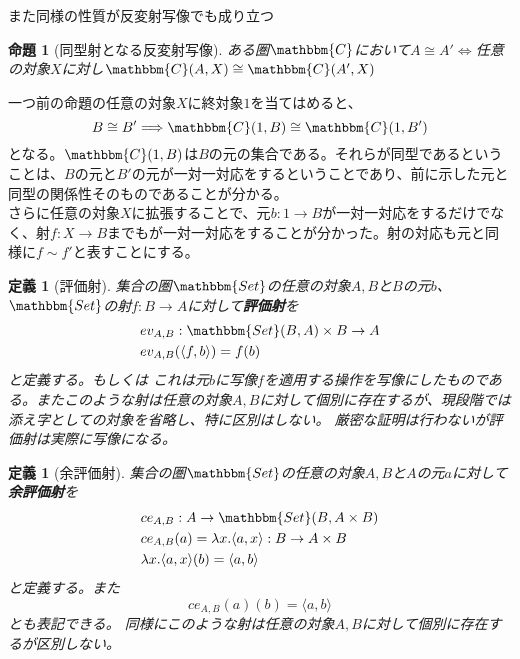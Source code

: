 \documentclass[uplatex,dvipdfmx]{jsarticle}
\newcommand{\cat}[1]{\mathbbm{#1}}
\newcommand{\arrow}{\rightarrow}
\newcommand{\tuple}[1]{\langle #1\rangle}
\newcommand{\mor}[3]{#1:#2\arrow #3}
\newcommand{\arset}[3]{\cat{#1}(#2,#3)}
\newtheorem{prop}[proof]{命題}
\newtheorem{define}[proof]{定義}
\numberwithin{proof}{subsection}
\begin{document}
  また同様の性質が反変射写像でも成り立つ
  \begin{prop}[同型射となる反変射写像]
    ある圏$\cat{C}$において$A\cong A'\iff$任意の対象$X$に対し$\arset{C}{A}{X}\cong\arset{C}{A'}{X}$
  \end{prop}

  一つ前の命題の任意の対象$X$に終対象$1$を当てはめると、\[B\cong B'\Longrightarrow \arset{C}{1}{B}\cong\arset{C}{1}{B'}\]となる。$\arset{C}{1}{B}$は$B$の元の集合である。それらが同型であるということは、$B$の元と$B'$の元が一対一対応をするということであり、前に示した元と同型の関係性そのものであることが分かる。\\
  さらに任意の対象$X$に拡張することで、元$\mor{b}{1}{B}$が一対一対応をするだけでなく、射$\mor{f}{X}{B}$までもが一対一対応をすることが分かった。射の対応も元と同様に$f\sim f'$と表すことにする。
  \begin{define}[評価射]
		集合の圏$\cat{Set}$の任意の対象$A,B$と$B$の元$b$、$\cat{Set}$の射$\mor{f}{B}{A}$に対して\textbf{評価射}を
		\begin{align*}
			\mor{&ev_{A,B}}{\arset{Set}{B}{A}\times B}{A}\\
			&ev_{A,B}(\tuple{f,b})=f(b)\\
		\end{align*}
		と定義する。もしくは
    これは元$b$に写像$f$を適用する操作を写像にしたものである。またこのような射は任意の対象$A,B$に対して個別に存在するが、現段階では添え字としての対象を省略し、特に区別はしない。
		厳密な証明は行わないが評価射は実際に写像になる。
	\end{define}

	\begin{define}[余評価射]
		集合の圏$\cat{Set}$の任意の対象$A,B$と$A$の元$a$に対して\textbf{余評価射}を
		\begin{align*}
			\mor{&ce_{A,B}}{A}{\arset{Set}{B}{A\times B}}\\
			&ce_{A,B}(a)=\lambda x.\tuple{a,x}\mor{}{B}{A\times B}\\
			&\lambda x.\tuple{a,x}(b)=\tuple{a,b}
		\end{align*}
		と定義する。また\[ce_{A,B}(a)(b)=\tuple{a,b}\]とも表記できる。
    同様にこのような射は任意の対象$A,B$に対して個別に存在するが区別しない。
	\end{define}
\end{document}
